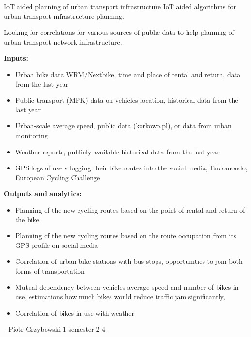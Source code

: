 \begin{project}
{IoT aided planning of urban transport infrastructure}
{IoT aided algorithms for urban transport infrastructure planning.} 
{ 
Looking for correlations for various sources of public data to help planning of urban transport network infrastructure.

\textbf{Inputs:}
\begin{itemize}
	\item Urban bike data WRM/Nextbike, time and place of rental and return, data from the last year
	\item Public transport (MPK) data on vehicles location, historical data from the last year
	\item Urban-scale average speed, public data (korkowo.pl), or data from urban monitoring
	\item Weather reports, publicly available historical data from the last year
	\item GPS logs of users logging their bike routes into the social media, Endomondo, European Cycling Challenge
\end{itemize} 
\textbf{Outputs and analytics:}
\begin{itemize}
	\item Planning of the new cycling routes based on the point of rental and return of the bike
	\item Planning of the new cycling routes based on the route occupation from its  GPS profile on social media
	\item Correlation of urban bike stations with bus stops, opportunities to join both forms of transportation
	\item Mutual dependency between vehicles average speed and number of bikes in use, estimations how much bikes would reduce traffic jam significantly,
	\item Correlation of bikes in use with weather 
\end{itemize} 
}
{-}
{Piotr Grzybowski}
{1 semester}
{2-4}
\end{project}
